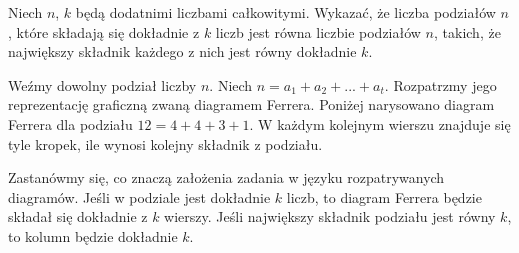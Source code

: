 \noindent
Niech $n$, $k$ będą dodatnimi liczbami całkowitymi. Wykazać, że liczba podziałów $n$, które składają się dokładnie z $k$ liczb jest równa liczbie podziałów $n$, takich, że największy składnik każdego z nich jest równy dokładnie $k$.

\vspace{5px}


\vspace{5px}

\noindent
Weźmy dowolny podział liczby $n$. Niech $n = a_1 + a_2 + ... + a_t$. Rozpatrzmy jego reprezentację graficzną zwaną diagramem Ferrera.
Poniżej narysowano diagram Ferrera dla podziału $12 = 4 + 4 + 3 + 1$.
W każdym kolejnym wierszu znajduje się tyle kropek, ile wynosi kolejny składnik z podziału. 

\begin{center}
\end{center}

\noindent
Zastanówmy się, co znaczą założenia zadania w języku rozpatrywanych diagramów.
Jeśli w podziale jest dokładnie $k$ liczb, to diagram Ferrera będzie składał się dokładnie z $k$ wierszy. Jeśli  największy składnik podziału jest równy $k$, to kolumn będzie dokładnie $k$.

